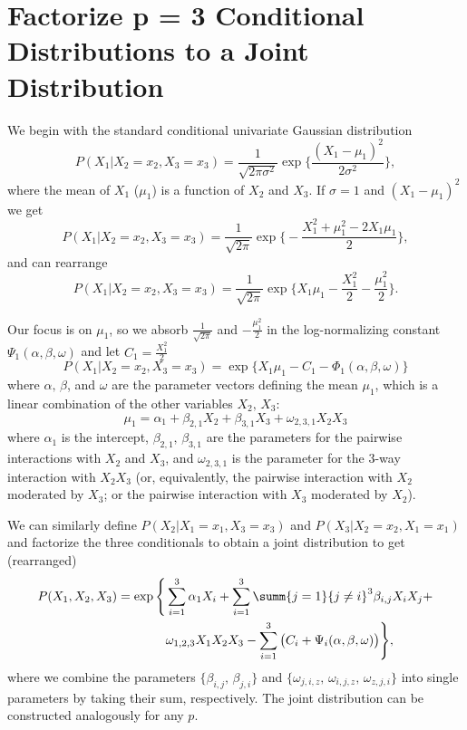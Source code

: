 \chapter{Factorize p = 3 Conditional Distributions to a Joint Distribution}
\label{app:A}
We begin with the standard conditional univariate Gaussian distribution
\begin{equation}
    P(X_1|X_2 = x_2,X_3 = x_3) = \frac{1}{\sqrt{2\pi\sigma^2}} \exp\Bigg\{\frac{(X_1 - \mu_1)^2}{2\sigma^2}\Bigg\},
\end{equation}
where the mean of $X_1$ ($\mu_1$) is a function of $X_2$ and $X_3$. If $\sigma = 1$ and $(X_1 - \mu_1)^2$ we get
\begin{equation}
    P(X_1|X_2 = x_2,X_3 = x_3) = \frac{1}{\sqrt{2\pi}} \exp\Bigg\{-\frac{X_1^2 + \mu_1^2 - 2X_1\mu_1}{2}\Bigg\},
\end{equation}
and can rearrange
\begin{equation}
    P(X_1|X_2 = x_2,X_3 = x_3) = \frac{1}{\sqrt{2\pi}} \exp\Bigg\{X_1\mu_1 - \frac{X_1^2}{2} - \frac{\mu_1^2}{2}\Bigg\}.
\end{equation}

Our focus is on $\mu_1$, so we absorb $\frac{1}{\sqrt{2\pi}}$ and $-\frac{\mu_1^2}{2}$ in the log-normalizing constant $\Psi_1(\alpha,\beta,\omega)$ and let $C_1 = \frac{X_1^2}{2}$
\begin{equation}
    P(X_1|X_2 = x_2,X_3 = x_3) = \exp\{X_1\mu_1 - C_1 - \Phi_1(\alpha,\beta,\omega)\}
\end{equation}
where $\alpha,\,\beta$, and $\omega$ are the parameter vectors defining the mean $\mu_1$, which is a linear combination of the other variables $X_2,\,X_3$:
\begin{equation}
    \mu_1 = \alpha_1 + \beta_{2,1}X_2 + \beta_{3,1}X_3 + \omega_{2,3,1}X_2 X_3
\end{equation}
where $\alpha_1$ is the intercept, $\beta_{2,1},\,\beta_{3,1}$ are the parameters for the pairwise interactions with $X_2$ and $X_3$, and $\omega_{2,3,1}$ is the parameter for the 3-way interaction with $X_2 X_3$ (or, equivalently, the pairwise interaction with $X_2$ moderated by $X_3$; or the pairwise interaction with $X_3$ moderated by $X_2$).

We can similarly define $P(X_2|X_1 = x_1,X_3 = x_3)$ and $P(X_3|X_2 = x_2,X_1 = x_1)$ and factorize the three conditionals to obtain a joint distribution to get (rearranged)
\begin{equation}
    \begin{split}
        P(X_1,X_2,X_3) = \exp\Bigg\{&\sum_{i=1}^3 \alpha_1 X_i + \sum_{i=1}^3 \summ{j=1}{j \neq i}^3 \beta_{i,j} X_i X_j + \\
        &\omega_{1,2,3} X_1 X_2 X_3 - \sum_{i=1}^3 \big(C_i + \Psi_i(\alpha,\beta,\omega)\big)\Bigg\},
    \end{split}
\end{equation}
where we combine the parameters $\{\beta_{i,j},\,\beta_{j,i}\}$ and $\{\omega_{j,i,z},\,\omega_{i,j,z},\,\omega_{z,j,i}\}$ into single parameters by taking their sum, respectively. The joint distribution can be constructed analogously for any $p$.

